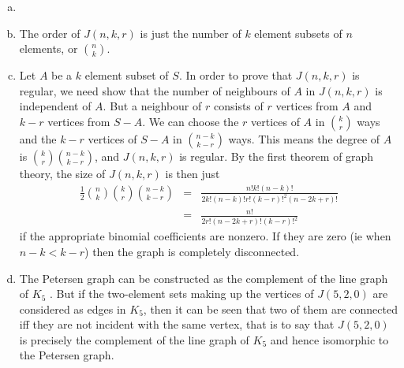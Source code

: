 \begin{enumerate}[(a)]
\item \ \\
	

\item The order of $J(n,k,r)$ is just the number of $k$ element subsets of $n$
	elements, or ${n \choose k}$.

\item Let $A$ be a $k$ element subset of $S$. In order to prove that 
	$J(n,k,r)$ is regular, we need show that the number of neighbours of $A$ in
	$J(n,k,r)$ is independent of $A$. But a neighbour of $r$ consists of $r$ vertices
	from $A$ and $k-r$ vertices from $S-A$. We can choose the $r$ vertices of $A$ in
	${k \choose r}$ ways and the $k-r$ vertices of $S-A$ in ${{n-k} \choose {k-r}}$ ways.
	This means the degree of $A$ is ${k \choose r}{{n-k} \choose {k-r}}$, and $J(n,k,r)$
	is regular. By the first
	theorem of graph theory, the size of $J(n,k,r)$ is then just 
	\begin{eqnarray*}
		\frac{1}{2}{n \choose k}{k \choose r}{{n-k} \choose {k-r}} &=& 
		\frac{n!k!(n-k)!}{2k!(n-k)!r!(k-r)!^2(n-2k+r)!}\\
		&=& \frac{n!}{2r!(n-2k+r)!(k-r)!^2}
	\end{eqnarray*}
	if the appropriate binomial coefficients are nonzero. If they are zero (ie when
	$n-k<k-r$) then the graph is completely disconnected.

\item The Petersen graph can be constructed 
	as the complement of the line graph of $K_5$ \cite{petersenwiki}.
	But if the two-element sets making up the vertices of $J(5,2,0)$ are considered
	as edges in $K_5$, then it can be seen that two of them are connected iff they
	are not incident with the same vertex, that is to say
	that $J(5,2,0)$ is precisely the complement
	of the line graph of $K_5$ and hence isomorphic to the Petersen graph.
\end{enumerate}
